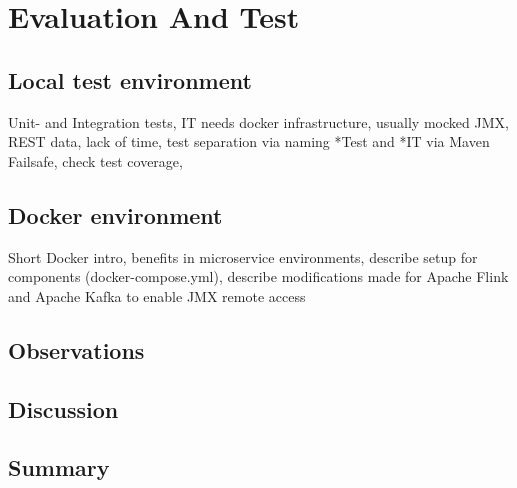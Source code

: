 \chapter{Evaluation And Test}
\section{Local test environment}

Unit- and Integration tests, IT needs docker infrastructure, usually mocked JMX, REST data,
lack of time, test separation via naming *Test and *IT via Maven Failsafe, check test coverage,

\section{Docker environment}

Short Docker intro, benefits in microservice environments, describe setup for components (docker-compose.yml),
describe modifications made for Apache Flink and Apache Kafka to enable JMX remote access

\section{Observations}

\section{Discussion}

\section{Summary}

